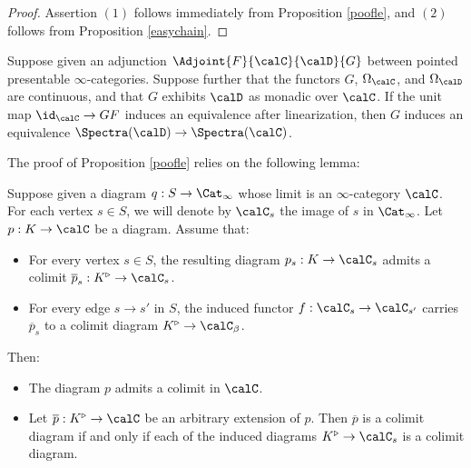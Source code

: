 \begin{proof}
Assertion $(1)$ follows immediately from Proposition \ref{poofle}, and $(2)$ follows
from Proposition \ref{easychain}.
\end{proof}

\begin{corollary}\label{hurpek}
Suppose given an adjunction
$\Adjoint{F}{\calC}{\calD}{G}$
between pointed presentable $\infty$-categories. Suppose further that
the functors $G$, $\Omega_{\calC}$, and $\Omega_{\calD}$ are continuous, and
that $G$ exhibits $\calD$ as monadic over $\calC$. If the unit map
$\id_{\calC} \rightarrow GF$ induces an equivalence after linearization, then
$G$ induces an equivalence $\Spectra(\calD) \rightarrow \Spectra(\calC)$.
\end{corollary}

The proof of Proposition \ref{poofle} relies on the following lemma:

\begin{lemma}\label{precougher}
Suppose given a diagram $q: S \rightarrow \Cat_{\infty}$ whose limit is an $\infty$-category $\calC$.
For each vertex $s \in S$, we will denote by $\calC_{s}$ the image of $s$ in $\Cat_{\infty}$.
Let $p: K \rightarrow \calC$ be a diagram. Assume that:
\begin{itemize}
\item[$(i)$] For every vertex $s \in S$, the resulting diagram
$p_{s}: K \rightarrow \calC_{s}$ admits a colimit
$\overline{p}_{s}: K^{\triangleright} \rightarrow \calC_{s}$.
\item[$(ii)$] For every edge $s \rightarrow s'$ in $S$, the induced functor
$f: \calC_{s} \rightarrow \calC_{s'}$ carries $\overline{p}_{s}$ to a colimit diagram
$K^{\triangleright} \rightarrow \calC_{\beta}$.
\end{itemize}
Then:
\begin{itemize}
\item[$(1)$] The diagram $p$ admits a colimit in $\calC$.
\item[$(2)$] Let $\overline{p}: K^{\triangleright} \rightarrow \calC$ be an arbitrary extension of $p$. Then $\overline{p}$ is a colimit diagram if and only if each of the induced diagrams $K^{\triangleright} \rightarrow \calC_{s}$ is a colimit diagram.
\end{itemize}
\end{lemma}

